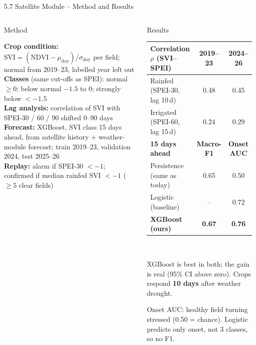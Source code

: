 \documentclass[aspectratio=169,10pt]{beamer}
\begin{document}
\begin{frame}{5.7 Satellite Module -- Method and Results}
\vspace{1mm}
\begin{columns}[T,onlytextwidth]
\begin{card}[equal height group=sat]{Method}
\footnotesize\raggedright
\textbf{Crop condition:} $\mathrm{SVI} = (\mathrm{NDVI} - \mu_{\mathrm{doy}}) / \sigma_{\mathrm{doy}}$ per field; normal from 2019--23, labelled year left out\\[3pt]
\textbf{Classes} (same cut-offs as SPEI): normal $\ge 0$; below normal $-1.5$ to $0$; strongly below $< -1.5$\\[3pt]
\textbf{Lag analysis:} correlation of SVI with SPEI-30 / 60 / 90 shifted 0--90 days\\[3pt]
\textbf{Forecast:} XGBoost, SVI class 15 days ahead, from satellite history + weather-module forecast; train 2019--23, validation 2024, test 2025--26\\[3pt]
\textbf{Replay:} alarm if SPEI-30 $< -1$; confirmed if median rainfed SVI $< -1$ ($\ge 5$ clear fields)
\end{card}
\begin{keycard}[equal height group=sat]{Results}
\footnotesize
\renewcommand{\arraystretch}{1.15}
\begin{tabularx}{\linewidth}{@{}Ycc@{}}
\toprule
\textbf{Correlation $\rho$ (SVI--SPEI)} & \textbf{2019--23} & \textbf{2024--26} \\ \midrule
Rainfed (SPEI-30, lag 10\,d) & 0.48 & 0.45 \\
Irrigated (SPEI-60, lag 15\,d) & 0.24 & 0.29 \\ \midrule
\textbf{15 days ahead} & \textbf{Macro-F1} & \textbf{Onset AUC} \\ \midrule
Persistence (same as today) & 0.65 & 0.50 \\
Logistic (baseline) & -- & 0.72 \\
\textbf{XGBoost (ours)} & \textbf{0.67} & \textbf{0.76} \\
\bottomrule
\end{tabularx}\\[3pt]
{\raggedright XGBoost is best in both; the gain is real (95\% CI above zero). Crops respond \textbf{10 days} after weather drought.\par}
{\scriptsize\raggedright\color{muted} Onset AUC: healthy field turning stressed (0.50 = chance). Logistic predicts only onset, not 3 classes, so no F1.\par}
\end{keycard}
\end{columns}
\end{frame}
\end{document}
